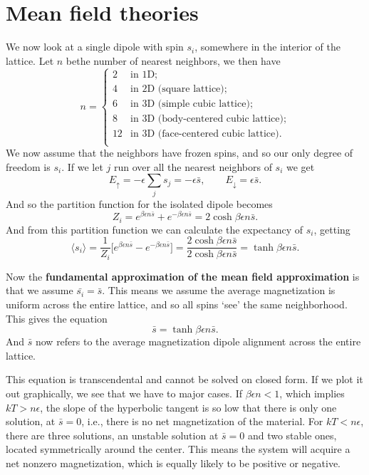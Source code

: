 \documentclass[a4paper, 11pt, notitlepage, english]{article}
\newcommand{\up}{\left|\uparrow\rangle\right.}
\newcommand{\down}{\left|\downarrow\rangle\right.}
\newcommand{\eps}{\epsilon}
\renewcommand{\up}{\uparrow}
\renewcommand{\down}{\downarrow}
\begin{document}
\section*{Mean field theories}

We now look at a single dipole with spin $s_i$, somewhere in the interior of the lattice. Let $n$ bethe number of nearest neighbors, we then have
$$n = \begin{cases}
	2 & \mbox{in 1D}; \\
	4 & \mbox{in 2D (square lattice)}; \\
	6 & \mbox{in 3D (simple cubic lattice)}; \\
	8 & \mbox{in 3D (body-centered cubic lattice)}; \\
	12 & \mbox{in 3D (face-centered cubic lattice)}. \\
\end{cases}$$
We now assume that the neighbors have frozen spins, and so our only degree of freedom is $s_i$. If we let $j$ run over all the nearest neighbors of $s_i$ we get
$$E_\up = -\eps \sum_{j} s_j = -\eps\bar{s}, \qquad E_\down = \eps \bar{s}.$$
And so the partition function for the isolated dipole becomes
$$Z_i = e^{\beta \eps n \bar{s}} + e^{-\beta \eps n \bar{s}} = 2\cosh{\beta\eps n\bar{s}}.$$
And from this partition function we can calculate the expectancy of $s_i$, getting
$$\langle s_i \rangle = \frac{1}{Z_i}\bigg[e^{\beta \eps n \bar{s}} - e^{-\beta \eps n \bar{s}} \bigg] = \frac{2\cosh{\beta\eps n\bar{s}}}{2\cosh{\beta\eps n\bar{s}}} = \tanh{\beta\eps n\bar{s}}.$$

Now the \textbf{fundamental approximation of the mean field approximation} is that we assume $\bar{s_i} = \bar{s}$. This means we assume the average magnetization is uniform across the entire lattice, and so all spins `see' the same neighborhood. This gives the equation
$$\bar{s} = \tanh{\beta\eps n\bar{s}}.$$
And $\bar{s}$ now refers to the average magnetization dipole alignment across the entire lattice.

This equation is transcendental and cannot be solved on closed form. If we plot it out graphically, we see that we have to major cases. If $\beta \eps n < 1$, which implies $kT > n\eps$, the slope of the hyperbolic tangent is so low that there is only one solution, at $\bar{s} = 0$, i.e., there is no net magnetization of the material. For $k T < n\eps$, there are three solutions, an unstable solution at $\bar{s} = 0$ and two stable ones, located symmetrically around the center. This means the system will acquire a net nonzero magnetization, which is equally likely to be positive or negative.
\end{document}
